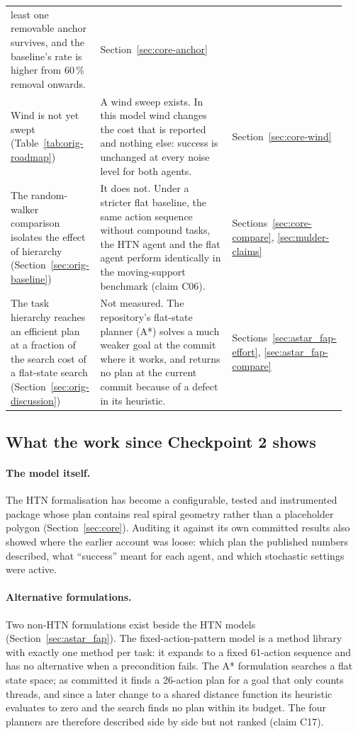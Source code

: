 \begin{longtable}{@{}p{0.27\linewidth}p{0.50\linewidth}p{0.17\linewidth}@{}}
least one removable anchor survives, and the baseline's rate is higher from 60\,\% removal onwards.
& Section~\ref{sec:core-anchor} \\
\addlinespace
Wind is not yet swept (Table~\ref{tab:orig-roadmap})
& A wind sweep exists. In this model wind changes the cost that is reported and nothing else: success is
unchanged at every noise level for both agents.
& Section~\ref{sec:core-wind} \\
\addlinespace
The random-walker comparison isolates the effect of hierarchy (Section~\ref{sec:orig-baseline})
& It does not. Under a stricter flat baseline, the same action sequence without compound tasks, the HTN
agent and the flat agent perform identically in the moving-support benchmark (claim C06).
& Sections~\ref{sec:core-compare}, \ref{sec:mulder-claims} \\
\addlinespace
The task hierarchy reaches an efficient plan at a fraction of the search cost of a flat-state search
(Section~\ref{sec:orig-discussion})
& Not measured. The repository's flat-state planner (A*) solves a much weaker goal at the commit where it
works, and returns no plan at the current commit because of a defect in its heuristic.
& Sections~\ref{sec:astar_fap-effort}, \ref{sec:astar_fap-compare} \\
\bottomrule
\end{longtable}
\endgroup

\subsection{What the work since Checkpoint 2 shows}
\label{sec:synthesis-new}

\paragraph{The model itself.}
The HTN formalisation has become a configurable, tested and instrumented package whose plan contains real
spiral geometry rather than a placeholder polygon (Section~\ref{sec:core}). Auditing it against its own
committed results also showed where the earlier account was loose: which plan the published numbers
described, what ``success'' meant for each agent, and which stochastic settings were active.

\paragraph{Alternative formulations.}
Two non-HTN formulations exist beside the HTN models (Section~\ref{sec:astar_fap}). The fixed-action-pattern
model is a method library with exactly one method per task: it expands to a fixed 61-action sequence and has
no alternative when a precondition fails. The A* formulation searches a flat state space; as committed it
finds a 26-action plan for a goal that only counts threads, and since a later change to a shared distance
function its heuristic evaluates to zero and the search finds no plan within its budget. The four planners
are therefore described side by side but not ranked (claim C17).

